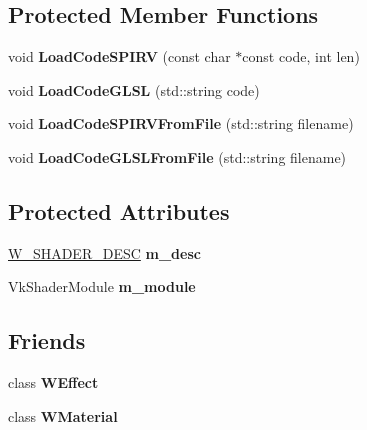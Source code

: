 \subsection*{Protected Member Functions}
\begin{DoxyCompactItemize}
\item 
void {\bfseries Load\+Code\+S\+P\+I\+RV} (const char $\ast$const code, int len)\hypertarget{class_w_shader_a63ad1afcf46d791088eecabf9c6622b0}{}\label{class_w_shader_a63ad1afcf46d791088eecabf9c6622b0}

\item 
void {\bfseries Load\+Code\+G\+L\+SL} (std\+::string code)\hypertarget{class_w_shader_a29cffc471a569bbd669969feed3245d5}{}\label{class_w_shader_a29cffc471a569bbd669969feed3245d5}

\item 
void {\bfseries Load\+Code\+S\+P\+I\+R\+V\+From\+File} (std\+::string filename)\hypertarget{class_w_shader_a53e2b763b3d9160eeb3712ddd315efd3}{}\label{class_w_shader_a53e2b763b3d9160eeb3712ddd315efd3}

\item 
void {\bfseries Load\+Code\+G\+L\+S\+L\+From\+File} (std\+::string filename)\hypertarget{class_w_shader_a027b08b66b2152f70889d95a37d8bf13}{}\label{class_w_shader_a027b08b66b2152f70889d95a37d8bf13}

\end{DoxyCompactItemize}
\subsection*{Protected Attributes}
\begin{DoxyCompactItemize}
\item 
\hyperlink{struct_w___s_h_a_d_e_r___d_e_s_c}{W\+\_\+\+S\+H\+A\+D\+E\+R\+\_\+\+D\+E\+SC} {\bfseries m\+\_\+desc}\hypertarget{class_w_shader_a887bf7b5a672bcc901eb8999713d8cfe}{}\label{class_w_shader_a887bf7b5a672bcc901eb8999713d8cfe}

\item 
Vk\+Shader\+Module {\bfseries m\+\_\+module}\hypertarget{class_w_shader_a4fc9835e83eac6bcbc2c166c0d5b4ad1}{}\label{class_w_shader_a4fc9835e83eac6bcbc2c166c0d5b4ad1}

\end{DoxyCompactItemize}
\subsection*{Friends}
\begin{DoxyCompactItemize}
\item 
class {\bfseries W\+Effect}\hypertarget{class_w_shader_aa862ff89ea243967dcfdb12c12ad040b}{}\label{class_w_shader_aa862ff89ea243967dcfdb12c12ad040b}

\item 
class {\bfseries W\+Material}\hypertarget{class_w_shader_a82829be2ace0f839dd132dface8a4da3}{}\label{class_w_shader_a82829be2ace0f839dd132dface8a4da3}

\end{DoxyCompactItemize}


